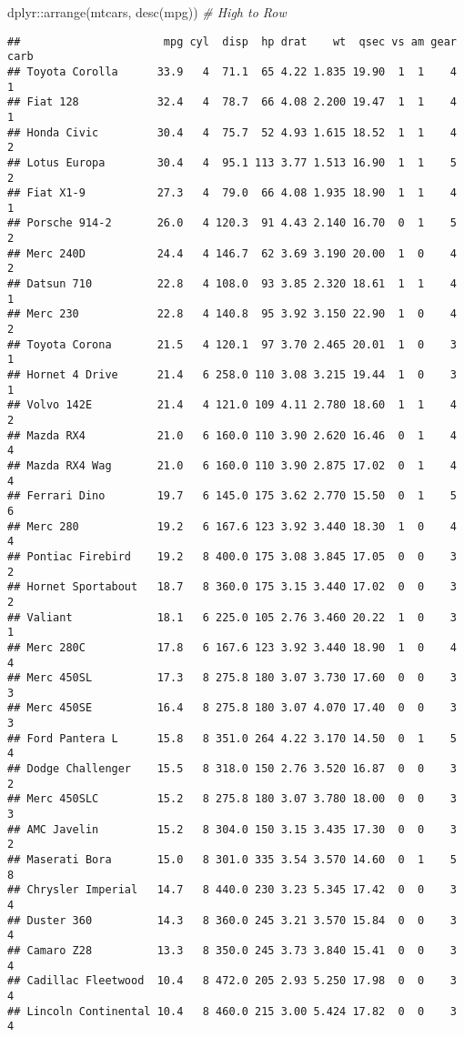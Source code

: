 \documentclass[
]{book}
\newenvironment{Shaded}{\begin{snugshade}}{\end{snugshade}}
\newcommand{\CommentTok}[1]{\textcolor[rgb]{0.56,0.35,0.01}{\textit{#1}}}
\newcommand{\FunctionTok}[1]{\textcolor[rgb]{0.00,0.00,0.00}{#1}}
\newcommand{\NormalTok}[1]{#1}
\newcommand{\SpecialCharTok}[1]{\textcolor[rgb]{0.00,0.00,0.00}{#1}}
\begin{document}
\begin{Shaded}
\begin{Highlighting}[]
\NormalTok{dplyr}\SpecialCharTok{::}\FunctionTok{arrange}\NormalTok{(mtcars, }\FunctionTok{desc}\NormalTok{(mpg)) }\CommentTok{\# High to Row}
\end{Highlighting}
\end{Shaded}

\begin{verbatim}
##                      mpg cyl  disp  hp drat    wt  qsec vs am gear carb
## Toyota Corolla      33.9   4  71.1  65 4.22 1.835 19.90  1  1    4    1
## Fiat 128            32.4   4  78.7  66 4.08 2.200 19.47  1  1    4    1
## Honda Civic         30.4   4  75.7  52 4.93 1.615 18.52  1  1    4    2
## Lotus Europa        30.4   4  95.1 113 3.77 1.513 16.90  1  1    5    2
## Fiat X1-9           27.3   4  79.0  66 4.08 1.935 18.90  1  1    4    1
## Porsche 914-2       26.0   4 120.3  91 4.43 2.140 16.70  0  1    5    2
## Merc 240D           24.4   4 146.7  62 3.69 3.190 20.00  1  0    4    2
## Datsun 710          22.8   4 108.0  93 3.85 2.320 18.61  1  1    4    1
## Merc 230            22.8   4 140.8  95 3.92 3.150 22.90  1  0    4    2
## Toyota Corona       21.5   4 120.1  97 3.70 2.465 20.01  1  0    3    1
## Hornet 4 Drive      21.4   6 258.0 110 3.08 3.215 19.44  1  0    3    1
## Volvo 142E          21.4   4 121.0 109 4.11 2.780 18.60  1  1    4    2
## Mazda RX4           21.0   6 160.0 110 3.90 2.620 16.46  0  1    4    4
## Mazda RX4 Wag       21.0   6 160.0 110 3.90 2.875 17.02  0  1    4    4
## Ferrari Dino        19.7   6 145.0 175 3.62 2.770 15.50  0  1    5    6
## Merc 280            19.2   6 167.6 123 3.92 3.440 18.30  1  0    4    4
## Pontiac Firebird    19.2   8 400.0 175 3.08 3.845 17.05  0  0    3    2
## Hornet Sportabout   18.7   8 360.0 175 3.15 3.440 17.02  0  0    3    2
## Valiant             18.1   6 225.0 105 2.76 3.460 20.22  1  0    3    1
## Merc 280C           17.8   6 167.6 123 3.92 3.440 18.90  1  0    4    4
## Merc 450SL          17.3   8 275.8 180 3.07 3.730 17.60  0  0    3    3
## Merc 450SE          16.4   8 275.8 180 3.07 4.070 17.40  0  0    3    3
## Ford Pantera L      15.8   8 351.0 264 4.22 3.170 14.50  0  1    5    4
## Dodge Challenger    15.5   8 318.0 150 2.76 3.520 16.87  0  0    3    2
## Merc 450SLC         15.2   8 275.8 180 3.07 3.780 18.00  0  0    3    3
## AMC Javelin         15.2   8 304.0 150 3.15 3.435 17.30  0  0    3    2
## Maserati Bora       15.0   8 301.0 335 3.54 3.570 14.60  0  1    5    8
## Chrysler Imperial   14.7   8 440.0 230 3.23 5.345 17.42  0  0    3    4
## Duster 360          14.3   8 360.0 245 3.21 3.570 15.84  0  0    3    4
## Camaro Z28          13.3   8 350.0 245 3.73 3.840 15.41  0  0    3    4
## Cadillac Fleetwood  10.4   8 472.0 205 2.93 5.250 17.98  0  0    3    4
## Lincoln Continental 10.4   8 460.0 215 3.00 5.424 17.82  0  0    3    4
\end{verbatim}
\end{document}
